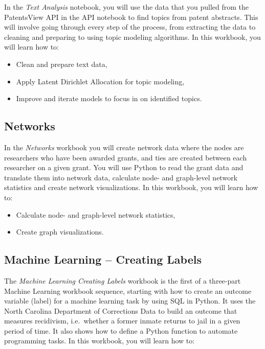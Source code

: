 \documentclass[]{krantz}
\begin{document}
In the \emph{Text Analysis} notebook, you will use the data that you
pulled from the PatentsView API in the API notebook to find topics from
patent abstracts. This will involve going through every step of the
process, from extracting the data to cleaning and preparing to using
topic modeling algorithms. In this workbook, you will learn how to:

\begin{itemize}
\item
  Clean and prepare text data,
\item
  Apply Latent Dirichlet Allocation for topic modeling,
\item
  Improve and iterate models to focus in on identified topics.
\end{itemize}

\subsection{Networks}\label{networks}

In the \emph{Networks} workbook you will create network data where the
nodes are researchers who have been awarded grants, and ties are created
between each researcher on a given grant. You will use Python to read
the grant data and translate them into network data, calculate node- and
graph-level network statistics and create network visualizations. In
this workbook, you will learn how to:

\begin{itemize}
\item
  Calculate node- and graph-level network statistics,
\item
  Create graph visualizations.
\end{itemize}

\subsection{Machine Learning -- Creating
Labels}\label{machine-learning-creating-labels}

The \emph{Machine Learning Creating Labels} workbook is the first of a
three-part Machine Learning workbook sequence, starting with how to
create an outcome variable (label) for a machine learning task by using
SQL in Python. It uses the North Carolina Department of Corrections Data
to build an outcome that measures recidivism, i.e.~whether a former
inmate returns to jail in a given period of time. It also shows how to
define a Python function to automate programming tasks. In this
workbook, you will learn how to:
\end{document}
